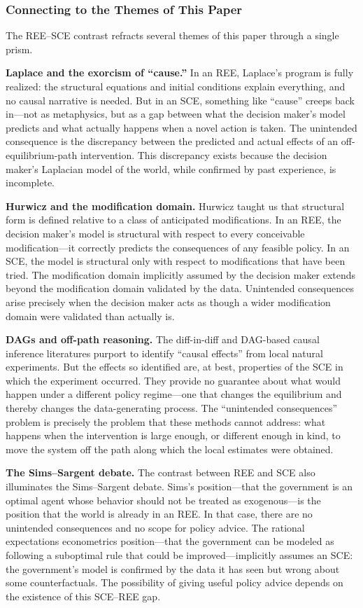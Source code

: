 \documentclass[12pt]{article}
\begin{document}
\subsubsection{Connecting to the Themes of This Paper}

The REE--SCE contrast  refracts several themes of this paper through a single prism.

\textbf{Laplace and the exorcism of ``cause.''} In an REE, Laplace's program is fully realized: the structural equations and initial conditions explain everything, and no causal narrative is needed. But in an SCE, something like ``cause'' creeps back in---not as metaphysics, but as a gap between what the decision maker's model predicts and what actually happens when a novel action is taken. The unintended consequence is the discrepancy between the predicted and actual effects of an off-equilibrium-path intervention. This discrepancy exists  because the decision maker's Laplacian model of the world, while confirmed by past experience, is incomplete.

\textbf{Hurwicz and the modification domain.} Hurwicz taught us that structural form is defined relative to a class of anticipated modifications. In an REE, the decision maker's model is structural with respect to every conceivable modification---it correctly predicts the consequences of any feasible policy. In an SCE, the model is structural only with respect to modifications that have been tried. The modification domain implicitly assumed by the decision maker extends beyond the modification domain validated by the data. Unintended consequences arise precisely when the decision maker acts as though a wider modification domain were validated than actually is.

\textbf{DAGs and off-path reasoning.} The diff-in-diff and DAG-based causal inference literatures purport to identify ``causal effects'' from local natural experiments. But the effects so identified are, at best, properties of the SCE in which the  experiment occurred. They provide no guarantee about what would happen under a different policy regime---one that changes the equilibrium and thereby changes the data-generating process. The ``unintended consequences'' problem is precisely the problem that these methods cannot address: what happens when the intervention is large enough, or different enough in kind, to move the system off the path along which the local estimates were obtained.

\textbf{The Sims--Sargent debate.} The contrast between REE and SCE also illuminates the Sims--Sargent debate. Sims's position---that the government is an optimal agent whose behavior should not be treated as exogenous---is the position that the world is already in an REE. In that case, there are no unintended consequences and no scope for policy advice. The rational expectations econometrics position---that the government can be modeled as following a suboptimal rule that could be improved---implicitly assumes an SCE: the government's model is confirmed by the data it has seen but wrong about some counterfactuals. The possibility of giving useful policy advice depends on the existence of this SCE--REE gap.
\end{document}
